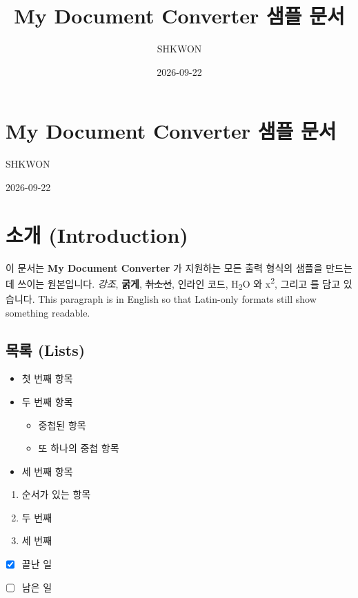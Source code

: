 \documentclass[11pt]{article}
\title{My Document Converter 샘플 문서}
\author{SHKWON}
\date{2026-09-22}
\begin{document}
\maketitle

\section*{My Document Converter 샘플 문서}\label{my-document-converter-샘플-문서}

SHKWON

2026-09-22

\section*{소개 (Introduction)}\label{소개-introduction}

이 문서는 \textbf{My Document Converter} 가 지원하는 모든 출력 형식의 샘플을 만드는 데 쓰이는
원본입니다. \emph{강조}, \textbf{굵게}, \sout{취소선}, 인라인 코드, H\textsubscript{2}O 와
x\textsuperscript{2}, 그리고 를 담고 있습니다. This paragraph is in English so
that Latin-only formats still show something readable.

\subsection*{목록 (Lists)}\label{목록-lists}

\begin{itemize}
\item 첫 번째 항목
\item 두 번째 항목
\begin{itemize}
\item 중첩된 항목
\item 또 하나의 중첩 항목
\end{itemize}
\item 세 번째 항목
\end{itemize}

\begin{enumerate}
\item 순서가 있는 항목
\item 두 번째
\item 세 번째
\end{enumerate}

\begin{itemize}
\item ☒ 끝난 일
\item ☐ 남은 일
\end{itemize}
\end{document}
